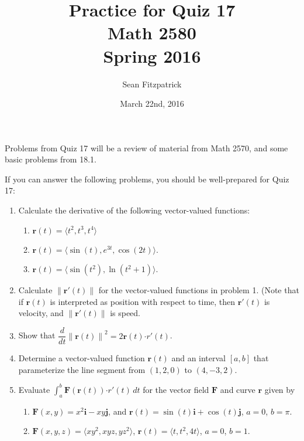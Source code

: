 \documentclass[letterpaper,12pt]{article}
\title{Practice for Quiz 17\\Math 2580\\Spring 2016}
\author{Sean Fitzpatrick}
\date{March 22nd, 2016}
\renewcommand{\i}{\mathbf{i}}
\renewcommand{\j}{\mathbf{j}}
\newcommand{\di}{\displaystyle}
\renewcommand{\r}{\mathbf{r}}
\newcommand{\len}[1]{\left\lVert #1\right\rVert}
\newcommand{\dotp}{\boldsymbol{\cdot}}
\newcommand{\F}{\mathbf{F}}
\begin{document}
 \maketitle

Problems from Quiz 17 will be a review of material from Math 2570, and some basic problems from 18.1.

If you can answer the following problems, you should be well-prepared for Quiz 17:



\begin{enumerate}
 \item Calculate the derivative of the following vector-valued functions:
\begin{enumerate}
 \item $\r(t) = \langle t^2, t^3, t^4\rangle$
 \item $\r(t) = \langle \sin(t), e^{3t}, \cos(2t)\rangle$.
 \item $\r(t) = \langle \sin(t^2), \ln(t^2+1)\rangle$.
\end{enumerate}
 \item Calculate $\len{\r'(t)}$ for the vector-valued functions in problem 1. (Note that if $\r(t)$ is interpreted as position with respect to time, then $\r'(t)$ is velocity, and $\len{\r'(t)}$ is speed.
 \item Show that $\dfrac{d}{dt}\len{\r(t)}^2 = 2\r(t)\dotp r'(t)$. 
 \item Determine a vector-valued function $\r(t)$ and an interval $[a,b]$ that parameterize the line segment from $(1,2,0)$ to $(4,-3,2)$.
 \item Evaluate $\di \int_a^b \F(\r(t))\dotp r'(t)\,dt$ for the vector field $\F$ and curve $\r$ given by
\begin{enumerate}
 \item $\F(x,y) = x^2\i -xy\j$, and $\r(t) = \sin(t)\i+\cos(t)\j$, $a=0$, $b=\pi$.
 \item $\F(x,y,z) = \langle xy^2, xyz, yz^2\rangle$, $\r(t) = \langle t, t^2, 4t\rangle$, $a=0$, $b=1$.
\end{enumerate}


 \end{enumerate}
\end{document}
